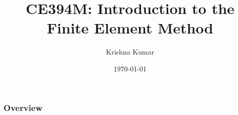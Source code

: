 \documentclass[notes]{beamer}
\title[CE394M: Intro to FEM]{CE394M: Introduction to the Finite Element Method}
\author{Krishna Kumar} %
\institute[UT Austin] %
{
University of Texas at Austin \\
\medskip
\textit{
  \url{krishnak@utexas.edu}} %
}
\date{\today} %
\begin{document}
\begin{frame}
\titlepage %
\end{frame}

\begin{frame}
 \frametitle{Overview}
 \tableofcontents
\end{frame}
\end{document}
